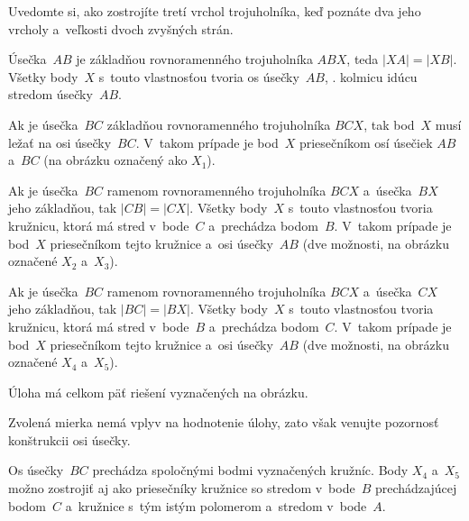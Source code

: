 {%
\napad
Uvedomte si, ako zostrojíte tretí vrchol trojuholníka, keď poznáte dva jeho vrcholy a~veľkosti dvoch zvyšných strán.

\riesenie
Úsečka~$AB$ je základňou rovnoramenného trojuholníka $ABX$, teda $|XA|=|XB|$.
Všetky body~$X$ s~touto vlastnosťou tvoria os úsečky~$AB$, \tj. kolmicu idúcu stredom úsečky~$AB$.

Ak je úsečka~$BC$ základňou rovnoramenného trojuholníka $BCX$, tak bod~$X$ musí ležať na osi úsečky~$BC$.
V~takom prípade je bod~$X$ priesečníkom osí úsečiek $AB$ a~$BC$ (na obrázku označený ako $X_1$).
%

Ak je úsečka~$BC$ ramenom rovnoramenného trojuholníka $BCX$ a~úsečka~$BX$ jeho základňou, tak $|CB|=|CX|$.
Všetky body~$X$ s~touto vlastnosťou tvoria kružnicu, ktorá má stred v~bode~$C$ a~prechádza bodom~$B$.
V~takom prípade je bod~$X$ priesečníkom tejto kružnice a~osi úsečky~$AB$ (dve možnosti, na obrázku označené $X_2$ a~$X_3$).

Ak je úsečka~$BC$ ramenom rovnoramenného trojuholníka $BCX$ a~úsečka~$CX$ jeho základňou, tak $|BC|=|BX|$.
Všetky body~$X$ s~touto vlastnosťou tvoria kružnicu, ktorá má stred v~bode~$B$ a~prechádza bodom~$C$.
V~takom prípade je bod~$X$ priesečníkom tejto kružnice a~osi úsečky~$AB$ (dve možnosti, na obrázku označené $X_4$ a~$X_5$).

Úloha má celkom päť riešení vyznačených na obrázku.

\poznamky
Zvolená mierka nemá vplyv na hodnotenie úlohy, zato však venujte pozornosť konštrukcii osi úsečky.

Os úsečky~$BC$ prechádza spoločnými bodmi vyznačených kružníc.
Body $X_4$ a~$X_5$ možno zostrojiť aj ako priesečníky kružnice so stredom v~bode~$B$ prechádzajúcej bodom~$C$ a~kružnice s~tým istým polomerom a~stredom v~bode~$A$.
}

